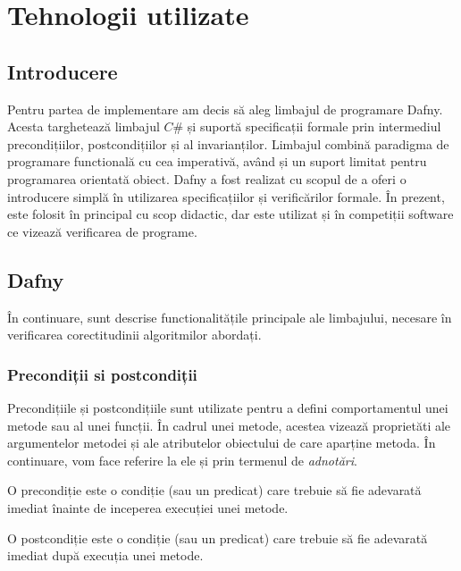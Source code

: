 \chapter{Tehnologii utilizate}

\section{Introducere}

Pentru partea de implementare am decis să aleg limbajul de programare Dafny. Acesta targhetează limbajul $C\#$ și suportă specificații formale prin intermediul precondițiilor, postcondițiilor și al invarianților. Limbajul combină paradigma de programare functională cu cea imperativă, având și un suport limitat pentru programarea orientată obiect. Dafny a fost realizat cu scopul de a oferi o introducere simplă în utilizarea specificațiilor și verificărilor formale. În prezent, este folosit în principal cu scop didactic, dar este utilizat și în competiții software ce vizează verificarea de programe.

\section{Dafny}

În continuare, sunt descrise functionalitățile principale ale limbajului, necesare în verificarea corectitudinii algoritmilor abordați. 

\subsection{Precondiții si postcondiții}

Precondițiile și postcondițiile sunt utilizate pentru a defini comportamentul unei metode sau al unei funcții. În cadrul unei metode, acestea vizează proprietăti ale argumentelor metodei și ale atributelor obiectului de care aparține metoda. În continuare, vom face referire la ele și prin termenul de \textit{adnotări}. 

\begin{definition}
O precondiție este o condiție (sau un predicat) care trebuie să fie adevarată imediat înainte de inceperea execuției unei metode. 
\end{definition}

\begin{definition}
O postcondiție este o condiție (sau un predicat) care trebuie să fie adevarată imediat după execuția unei metode. 
\end{definition}

